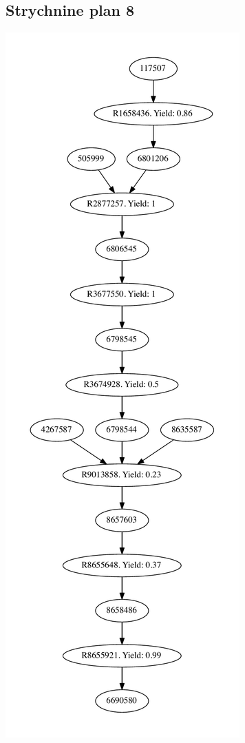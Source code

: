 \documentclass[a4paper,10pt,titlepage]{paper}
\begin{document}
\subsection{Strychnine plan 8}
\centering
\includegraphics[scale=0.4]{Synteseplaner/Strychnine/plan8.pdf}
\label{Appendix::Strychnine8}
\end{document}
